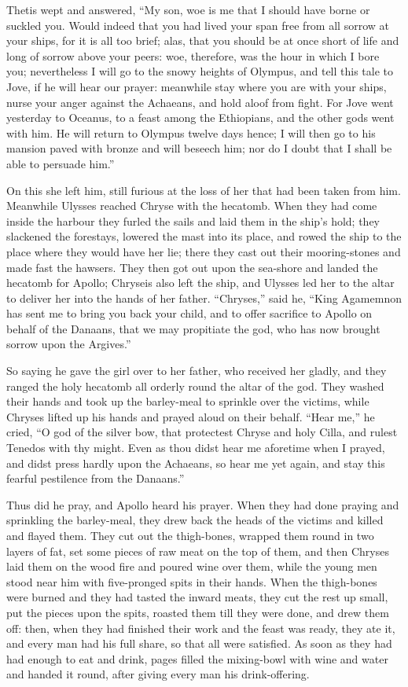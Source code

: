 Thetis wept and answered, “My son, woe is me that I should have borne or
suckled you. Would indeed that you had lived your span free from all
sorrow at your ships, for it is all too brief; alas, that you should be at
once short of life and long of sorrow above your peers: woe, therefore,
was the hour in which I bore you; nevertheless I will go to the snowy
heights of Olympus, and tell this tale to Jove, if he will hear our
prayer: meanwhile stay where you are with your ships, nurse your anger
against the Achaeans, and hold aloof from fight. For Jove went yesterday
to Oceanus, to a feast among the Ethiopians, and the other gods went with
him. He will return to Olympus twelve days hence; I will then go to his
mansion paved with bronze and will beseech him; nor do I doubt that I
shall be able to persuade him.”

On this she left him, still furious at the loss of her that had been taken
from him. Meanwhile Ulysses reached Chryse with the hecatomb. When they
had come inside the harbour they furled the sails and laid them in the
ship’s hold; they slackened the forestays, lowered the mast into its
place, and rowed the ship to the place where they would have her lie;
there they cast out their mooring-stones and made fast the hawsers. They
then got out upon the sea-shore and landed the hecatomb for Apollo;
Chryseis also left the ship, and Ulysses led her to the altar to deliver
her into the hands of her father. “Chryses,” said he, “King Agamemnon has
sent me to bring you back your child, and to offer sacrifice to Apollo on
behalf of the Danaans, that we may propitiate the god, who has now brought
sorrow upon the Argives.”

So saying he gave the girl over to her father, who received her gladly,
and they ranged the holy hecatomb all orderly round the altar of the god.
They washed their hands and took up the barley-meal to sprinkle over the
victims, while Chryses lifted up his hands and prayed aloud on their
behalf. “Hear me,” he cried, “O god of the silver bow, that protectest
Chryse and holy Cilla, and rulest Tenedos with thy might. Even as thou
didst hear me aforetime when I prayed, and didst press hardly upon the
Achaeans, so hear me yet again, and stay this fearful pestilence from the
Danaans.”

Thus did he pray, and Apollo heard his prayer. When they had done praying
and sprinkling the barley-meal, they drew back the heads of the victims
and killed and flayed them. They cut out the thigh-bones, wrapped them
round in two layers of fat, set some pieces of raw meat on the top of
them, and then Chryses laid them on the wood fire and poured wine over
them, while the young men stood near him with five-pronged spits in their
hands. When the thigh-bones were burned and they had tasted the inward
meats, they cut the rest up small, put the pieces upon the spits, roasted
them till they were done, and drew them off: then, when they had finished
their work and the feast was ready, they ate it, and every man had his
full share, so that all were satisfied. As soon as they had had enough to
eat and drink, pages filled the mixing-bowl with wine and water and handed
it round, after giving every man his drink-offering.


